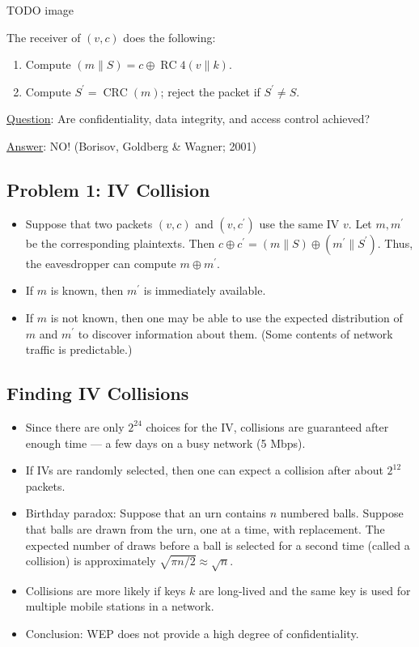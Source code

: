 TODO image

The receiver of $(v, c)$ does the following:
\begin{enumerate}
      \item Compute $(m \| S)=c \oplus \operatorname{RC} 4(v \| k)$.
      \item Compute $S^{\prime}=\operatorname{CRC}(m)$; reject the packet if $S^{\prime} \neq S$.
\end{enumerate}
\underline{Question}: Are confidentiality, data integrity,
and access control achieved?

\underline{Answer}: NO\@! (Borisov, Goldberg \& Wagner; 2001)

\subsection*{Problem 1: IV Collision}
\begin{itemize}
      \item Suppose that two packets $(v, c)$ and $\left(v, c^{\prime}\right)$
            use the same IV $v$. Let $m, m^{\prime}$ be the corresponding plaintexts.
            Then $c \oplus c^{\prime}=(m \| S) \oplus\left(m^{\prime} \| S^{\prime}\right) $.
            Thus, the eavesdropper can
            compute $m \oplus m^{\prime}$.
      \item If $m$ is known, then $m^{\prime}$ is immediately available.
      \item If $m$ is not known, then one may be able to use the
            expected distribution of $m$ and $m^{\prime}$ to discover information
            about them. (Some contents of network traffic is predictable.)
\end{itemize}
\subsection*{Finding IV Collisions}
\begin{itemize}
      \item Since there are only $2^{24}$ choices for the IV, collisions are
            guaranteed after enough time --- a few days on a busy network
            (5 Mbps).
      \item If IVs are randomly selected, then one can expect a collision after about $2^{12}$ packets.
      \item Birthday paradox: Suppose that an urn contains $n$ numbered balls. Suppose that balls are drawn from the urn, one at a time, with replacement. The expected number of draws before a ball is selected for a second time (called a collision) is approximately $\sqrt{\pi n / 2} \approx \sqrt{n}$.
      \item Collisions are more likely if keys $k$ are long-lived and the same key is used for multiple mobile stations in a network.
      \item Conclusion: WEP does not provide a high degree of confidentiality.
\end{itemize}


